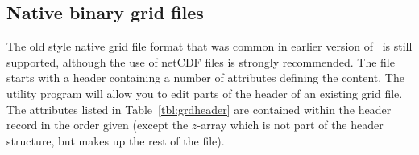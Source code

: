 \subsection{Native binary grid files}

The old style native grid file format that was common in earlier version of \GMT\ is still
supported, although the use of netCDF files is strongly recommended.
The file starts with a header containing a number of attributes defining the content.
The  utility program will allow you to edit parts of
the header of an existing grid file.  The attributes listed in Table~\ref{tbl:grdheader}
are contained within the header record in the order given (except the $z$-array which
is not part of the header structure, but makes up the rest of the file).

